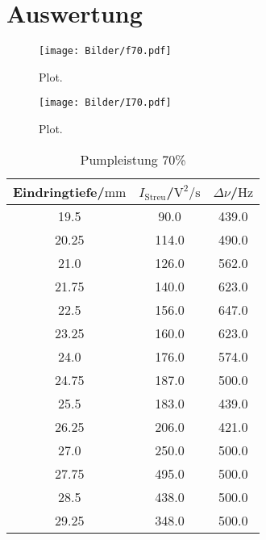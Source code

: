 \section{Auswertung}
\label{sec:Auswertung}





\begin{figure}
  \centering
  \texttt{[image: Bilder/f70.pdf]}
  \caption{Plot.}
  \label{fig:f70}
\end{figure}
\begin{figure}
  \centering
  \texttt{[image: Bilder/I70.pdf]}
  \caption{Plot.}
  \label{fig:I70}
\end{figure}

\begin{table}
\centering
\caption{Pumpleistung 70\%}
\label{tab:pl70}
\begin{tabular}{ccc}
  \toprule
Eindringtiefe/$\si{\milli\meter}$ & $I_\mathrm{Streu}$/$\si{\square\volt\per\second}$ & $\Delta \nu$/$\si{\Hz}$ \\
\midrule
19.5 & 90.0 & 439.0 \\
20.25 & 114.0 & 490.0 \\
21.0 & 126.0 & 562.0 \\
21.75 & 140.0 & 623.0 \\
22.5 & 156.0 & 647.0 \\
23.25 & 160.0 & 623.0 \\
24.0 & 176.0 & 574.0 \\
24.75 & 187.0 & 500.0 \\
25.5 & 183.0 & 439.0 \\
26.25 & 206.0 & 421.0 \\
27.0 & 250.0 & 500.0 \\
27.75 & 495.0 & 500.0 \\
28.5 & 438.0 & 500.0 \\
29.25 & 348.0 & 500.0 \\
\bottomrule
\end{tabular}
\end{table}




